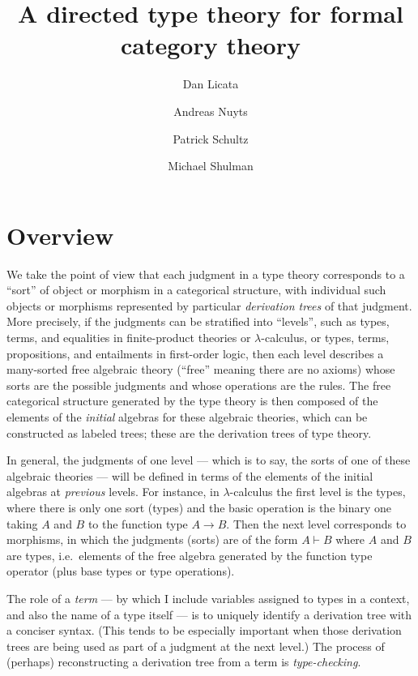 \documentclass{amsart}
\title{A directed type theory for formal category theory}
\author{Dan Licata \and Andreas Nuyts \and Patrick Schultz \and Michael Shulman}
\let\types\vdash %
\theoremstyle{definition}
\begin{document}
\maketitle

\section{Overview}

We take the point of view that each judgment in a type theory corresponds to a ``sort'' of object or morphism in a categorical structure, with individual such objects or morphisms represented by particular \emph{derivation trees} of that judgment.
More precisely, if the judgments can be stratified into ``levels'', such as types, terms, and equalities in finite-product theories or $\lambda$-calculus, or types, terms, propositions, and entailments in first-order logic, then each level describes a many-sorted free algebraic theory (``free'' meaning there are no axioms) whose sorts are the possible judgments and whose operations are the rules.
The free categorical structure generated by the type theory is then composed of the elements of the \emph{initial} algebras for these algebraic theories, which can be constructed as labeled trees; these are the derivation trees of type theory.

In general, the judgments of one level --- which is to say, the sorts of one of these algebraic theories --- will be defined in terms of the elements of the initial algebras at \emph{previous} levels.
For instance, in $\lambda$-calculus the first level is the types, where there is only one sort (types) and the basic operation is the binary one taking $A$ and $B$ to the function type $A\to B$.
Then the next level corresponds to morphisms, in which the judgments (sorts) are of the form $A\types B$ where $A$ and $B$ are types, i.e.\ elements of the free algebra generated by the function type operator (plus base types or type operations).

The role of a \emph{term} --- by which I include variables assigned to types in a context, and also the name of a type itself --- is to uniquely identify a derivation tree with a conciser syntax.
(This tends to be especially important when those derivation trees are being used as part of a judgment at the next level.)
The process of (perhaps) reconstructing a derivation tree from a term is \emph{type-checking}.
\end{document}
